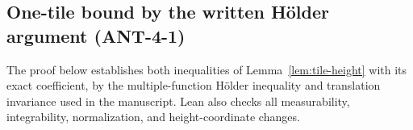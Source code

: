 
\subsection{One-tile bound by the written H\"older argument (ANT-4-1)}
\label{leanproof:ANT-4-1}

The proof below establishes both inequalities of Lemma~\ref{lem:tile-height}
with its exact coefficient, by the multiple-function H\"older inequality and
translation invariance used in the manuscript. Lean also checks all
measurability, integrability, normalization, and height-coordinate changes.

